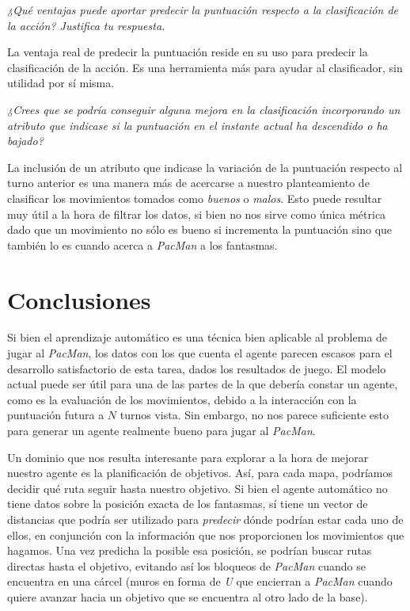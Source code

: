 \documentclass[12pt]{article}
\begin{document}
\begin{center}
     \emph{¿Qué ventajas puede aportar predecir la puntuación respecto a la clasificación de la acción? Justifica tu respuesta.}
\end{center}

La ventaja real de predecir la puntuación reside en su uso para predecir la clasificación de la acción. Es una herramienta más para ayudar al clasificador, sin utilidad por sí misma.

\begin{center}
    \emph{¿Crees que se podría conseguir alguna mejora en la clasificación incorporando un atributo que indicase si la puntuación en el instante actual ha descendido o ha bajado?}
\end{center}

La inclusión de un atributo que indicase la variación de la puntuación respecto al turno anterior es una manera más de acercarse a nuestro planteamiento de clasificar los movimientos tomados como \emph{buenos} o \emph{malos}. Esto puede resultar muy útil a la hora de filtrar los datos, si bien no nos sirve como única métrica dado que un movimiento no sólo es bueno si incrementa la puntuación sino que también lo es cuando acerca a \emph{PacMan} a los fantasmas.
\vspace{-0.3cm}

\newpage
\section{Conclusiones}

Si bien el aprendizaje automático es una técnica bien aplicable al problema de jugar al \emph{PacMan}, los datos con los que cuenta el agente parecen escasos para el desarrollo satisfactorio de esta tarea, dados los resultados de juego. El modelo actual puede ser útil para una de las partes de la que debería constar un agente, como es la evaluación de los movimientos, debido a la interacción con la puntuación futura a $N$ turnos vista. Sin embargo, no nos parece suficiente esto para generar un agente realmente bueno para jugar al \emph{PacMan}.

Un dominio que nos resulta interesante para explorar a la hora de mejorar nuestro agente es la planificación de objetivos. Así, para cada mapa, podríamos decidir qué ruta seguir hasta nuestro objetivo. Si bien el agente automático no tiene datos sobre la posición exacta de los fantasmas, sí tiene un vector de distancias que podría ser utilizado para \emph{predecir} dónde podrían estar cada uno de ellos, en conjunción con la información que nos proporcionen los movimientos que hagamos. Una vez predicha la posible esa posición, se podrían buscar rutas directas hasta el objetivo, evitando así los bloqueos de \emph{PacMan} cuando se encuentra en una cárcel (muros en forma de \emph{U} que encierran a \emph{PacMan} cuando quiere avanzar hacia un objetivo que se encuentra al otro lado de la base).
\end{document}

